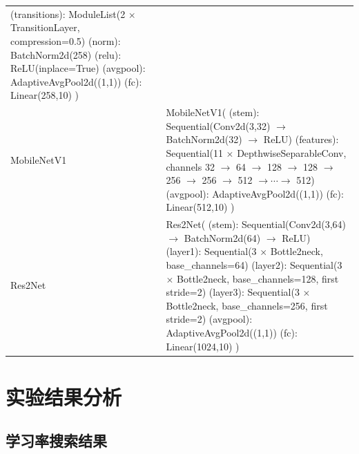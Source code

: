 \documentclass[a4paper]{article}
\begin{document}
\begin{table}[htbp]
\begin{tabular}{p{} p{}}
{\quad (transitions): ModuleList(2 $\times$ TransitionLayer, compression=0.5)\\
\quad (norm): BatchNorm2d(258)\\
\quad (relu): ReLU(inplace=True)\\
\quad (avgpool): AdaptiveAvgPool2d((1,1))\\
\quad (fc): Linear(258,10)\\
)}
\\[2mm]
MobileNetV1 &
\parbox[t]{0.81\textwidth}{\ttfamily
MobileNetV1(\\
\quad (stem): Sequential(Conv2d(3,32) $\rightarrow$ BatchNorm2d(32) $\rightarrow$ ReLU)\\
\quad (features): Sequential(11 $\times$ DepthwiseSeparableConv,\\
\qquad channels 32 $\rightarrow$ 64 $\rightarrow$ 128 $\rightarrow$ 128 $\rightarrow$ 256 $\rightarrow$ 256 $\rightarrow$ 512 $\rightarrow \cdots \rightarrow$ 512)\\
\quad (avgpool): AdaptiveAvgPool2d((1,1))\\
\quad (fc): Linear(512,10)\\
)}
\\[2mm]
Res2Net &
\parbox[t]{0.81\textwidth}{\ttfamily
Res2Net(\\
\quad (stem): Sequential(Conv2d(3,64) $\rightarrow$ BatchNorm2d(64) $\rightarrow$ ReLU)\\
\quad (layer1): Sequential(3 $\times$ Bottle2neck, base\_channels=64)\\
\quad (layer2): Sequential(3 $\times$ Bottle2neck, base\_channels=128, first stride=2)\\
\quad (layer3): Sequential(3 $\times$ Bottle2neck, base\_channels=256, first stride=2)\\
\quad (avgpool): AdaptiveAvgPool2d((1,1))\\
\quad (fc): Linear(1024,10)\\
)}
\\
\bottomrule
\end{tabular}
\label{tab:model_prints}
\end{table}

\section{实验结果分析}
\subsection{学习率搜索结果}

\end{document}
